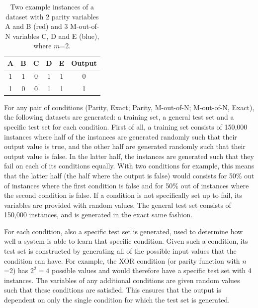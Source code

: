 \documentclass[letterpaper]{article} %
\begin{document}
\begin{table}[b]
\caption{Two example instances of a dataset with 2 parity variables A and B (red) and 3 M-out-of-N variables C, D and E (blue), where $m$=2.}
\centering
\begin{tabular}{|c|c|c|c|c|c|}
\hline
\cellcolor[HTML]{FD6864}A & \cellcolor[HTML]{FD6864}B & \cellcolor[HTML]{34CDF9}C & \cellcolor[HTML]{34CDF9}D & \cellcolor[HTML]{34CDF9}E & Output \\ \hline
1                         & 1                         & 0                         & 1                         & 1                         & 0      \\ \hline
1                         & 0                         & 0                         & 1                         & 1                         & 1      \\ \hline
\end{tabular}
\label{tbl:instance_example}
\end{table}

For any pair of conditions (Parity, Exact; Parity, M-out-of-N; M-out-of-N, Exact), the following datasets are generated: a training set, a general test set and a specific test set for each condition. First of all, a training set consists of 150,000 instances where half of the instances are generated randomly such that their output value is true, and the other half are generated randomly such that their output value is false.  In the latter half, the instances are generated such that they fail on each of its conditions equally. With two conditions for example, this means that the latter half (the half where the output is false) would consists for 50\% out of instances where the first condition is false and for 50\% out of instances where the second condition is false. If a condition is not specifically set up to fail, its variables are provided with random values. The general test set consists of 150,000 instances, and is generated in the exact same fashion.

For each condition, also a specific test set is generated, used to determine how well a system is able to learn that specific condition. Given such a condition, its test set is constructed by generating all of the possible input values that the condition can have. For example, the XOR condition (or parity function with $n$=2) has $2^2=4$ possible values and would therefore have a specific test set with 4 instances. The variables of any additional conditions are given random values such that these conditions are satisfied. This ensures that the output is dependent on only the single condition for which the test set is generated. %
\end{document}
